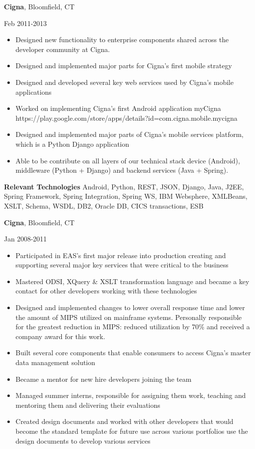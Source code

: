 \documentclass[a4paper,online]{adcv}
\begin{document}
\begin{adcvtabletwo}
  \adcvrowskip
  {\textbf{Cigna}, Bloomfield, CT}
  
   {Feb 2011-2013}
  \begin{itemize}
    \item Designed new functionality to enterprise components shared across the developer community at Cigna.
    \item Designed and implemented major parts for Cigna’s first mobile strategy
    \item Designed and developed several key web services used by Cigna’s mobile applications
    \item Worked on implementing Cigna’s first Android application myCigna https://play.google.com/store/apps/details?id=com.cigna.mobile.mycigna
    \item Designed and implemented major parts of Cigna’s mobile services platform, which is a Python Django application
    \item Able to be contribute on all layers of our technical stack device (Android), middleware (Python + Django) and backend services (Java + Spring).

  \end{itemize}
  \adcvrowskip
  \textbf{Relevant Technologies} Android, Python, REST, JSON, Django, Java, J2EE, Spring Framework, Spring Integration, Spring WS, IBM Websphere, XMLBeans, XSLT, Schema, WSDL, DB2, Oracle DB, CICS transactions, ESB
  
  \adcvrowskip
  {\textbf{Cigna}, Bloomfield, CT}
  
   {Jan 2008-2011}
  \begin{itemize}
    \item Participated in EAS's first major release into production creating and supporting several major key services that were critical to the business
    \item Mastered ODSI, XQuery \& XSLT transformation language and became a key contact for other developers working with these technologies
    \item Designed and implemented changes to lower overall response time and lower the amount of MIPS utilized on mainframe systems. Personally responsible for the greatest reduction in MIPS: reduced utilization by 70\% and received a company award for this work.
    \item Built several core components that enable consumers to access Cigna's master data management solution
    \item Became a mentor for new hire developers joining the team
    \item Managed summer interns, responsible for assigning them work, teaching and mentoring them and delivering their evaluations
    \item Created design documents and worked with other developers that would become the standard template for future use across various portfolios use the design documents to develop various services


\end{itemize}
\end{adcvtabletwo}
\end{document}
